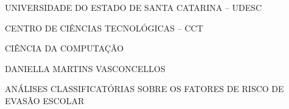 

\renewcommand{\imprimircapa}{%
	\begin{capa}%
		\center

		{\fontseries{b}\selectfont\MakeTextUppercase{UNIVERSIDADE DO ESTADO DE SANTA CATARINA -- UDESC}}
		
		{\fontseries{b}\selectfont\MakeTextUppercase{CENTRO DE CIÊNCIAS TECNOLÓGICAS -- CCT  }}
		
		{\fontseries{b}\selectfont\MakeTextUppercase{CIÊNCIA DA COMPUTAÇÃO  }}
		
		\vfill
		
		{\fontseries{b}\selectfont\MakeTextUppercase{\normalsize Daniella Martins Vasconcellos}}
		
		\vfill
		\begin{center}
			{\fontseries{b}\selectfont\MakeTextUppercase{Análises classificatórias sobre os fatores de risco de evasão escolar}}
		\end{center}
		\vfill
		
		\vfill
		
		{\fontseries{b}\selectfont\MakeTextUppercase{\imprimirlocal}}
		\par
		{\selectfont \imprimirdata}
		\vspace*{1cm}
	\end{capa}
}



\imprimircapa				%

